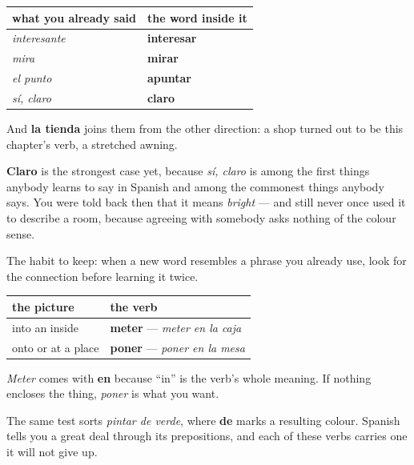 \begin{grammarlens}[title={Grammar Lens: the fourth phrase to give up a word}]
\noindent
\begin{tabularx}{\linewidth}{@{}>{\raggedright\arraybackslash}X>{\raggedright\arraybackslash}X@{}}
\toprule
\textbf{what you already said} & \textbf{the word inside it} \\
\midrule
\emph{interesante} & \textbf{interesar} \\
\emph{mira} & \textbf{mirar} \\
\emph{el punto} & \textbf{apuntar} \\
\emph{sí, claro} & \textbf{claro} \\
\bottomrule
\end{tabularx}

And \textbf{la tienda} joins them from the other direction: a shop turned out to be this chapter's verb, a stretched awning.

\textbf{Claro} is the strongest case yet, because \emph{sí, claro} is among the first things anybody learns to say in Spanish and among the commonest things anybody says. You were told back then that it means \emph{bright} — and still never once used it to describe a room, because agreeing with somebody asks nothing of the colour sense.

The habit to keep: when a new word resembles a phrase you already use, look for the connection before learning it twice.
\end{grammarlens}

\begin{grammarlens}[title={Grammar Lens: two verbs that both mean put}]
\noindent
\begin{tabularx}{\linewidth}{@{}>{\raggedright\arraybackslash}X>{\raggedright\arraybackslash}X@{}}
\toprule
\textbf{the picture} & \textbf{the verb} \\
\midrule
into an inside & \textbf{meter} — \emph{meter en la caja} \\
onto or at a place & \textbf{poner} — \emph{poner en la mesa} \\
\bottomrule
\end{tabularx}

\emph{Meter} comes with \textbf{en} because \textquotedblleft{}in\textquotedblright{} is the verb's whole meaning. If nothing encloses the thing, \emph{poner} is what you want.

The same test sorts \emph{pintar de verde}, where \textbf{de} marks a resulting colour. Spanish tells you a great deal through its prepositions, and each of these verbs carries one it will not give up.
\end{grammarlens}

